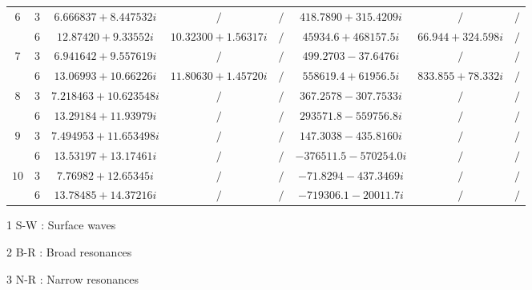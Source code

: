 \documentclass[aps,prd,longbibliography,reprint,twocolumn,amsmath,amssymb,amsfonts,showpacs,footnote,superscriptaddress]{revtex4-1}%
\begin{document}
\begin{table}[htp]
\begin{threeparttable}[htp]
\begin{ruledtabular}
\begin{tabular}{cccccccc}
$6$  & $3$  & $ 6.666837+8.447532 i $  & $/ $  & $ /$  & $418.7890+315.4209 i$ & $/ $ & $/ $  \\
     & $6$  & $ 12.87420+9.33552 i $  & $ 10.32300+1.56317 i$  & $/ $  & $45934.6+468157.5 i $ & $ 66.944+324.598 i$ & $/ $  \\

$7$  & $3$  & $ 6.941642+9.557619 i $  & $ /$  & $/ $  & $499.2703-37.6476 i $ & $ /$ & $ /$  \\
     & $6$  & $13.06993+10.66226 i $  & $ 11.80630+1.45720 i  $  & $ /$  & $558619.4+61956.5 i $ & $ 833.855+78.332 i $ & $/ $  \\

$8$  & $3$  & $7.218463+10.623548 i $  & $ /$  & $/ $  & $ 367.2578-307.7533 i  $ & $ /$ & $/ $  \\
     & $6$  & $13.29184+11.93979 i $  & $/ $  & $/ $  & $ 293571.8-559756.8 i $ & $/ $ & $/ $  \\

$9$  & $3$  & $ 7.494953+11.653498 i $  & $/ $  & $/ $  & $147.3038-435.8160 i  $ & $ /$ & $/ $  \\
     & $6$  & $ 13.53197+13.17461 i  $  & $/ $  & $/ $  & $ -376511.5-570254.0 i  $ & $/$ & $ /$  \\

$10$ & $3$  & $7.76982+12.65345 i $  & $/ $  & $/ $  & $-71.8294-437.3469 i  $ & $/ $ & $ /$  \\
     & $6$  & $ 13.78485+14.37216 i$  & $ /$  & $/ $  & $ -719306.1-20011.7 i $ & $ /$ & $/ $  \\

\end{tabular}
\end{ruledtabular}
\begin{tablenotes}
     \item[1] S-W : Surface waves
     \item[2] B-R : Broad resonances
     \item[3] N-R : Narrow  resonances
   \end{tablenotes}
\end{threeparttable}
\end{table}
\endgroup
\end{document}
